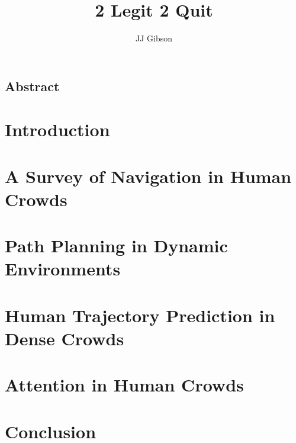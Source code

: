 \documentclass[twoside,10pt]{report}
\newcommand{\clearemptydoublepage}{\newpage{\pagestyle{empty}\cleardoublepage}}
\begin{document}


\title{2 Legit 2 Quit}
\author{JJ Gibson}



\clearpage


\clearemptydoublepage
\setcounter{page}{1}

\begin{centering} \section*{Abstract} \end{centering}


\tableofcontents
\clearpage


\setcounter{page}{1}


\chapter{Introduction}
\label{chap:introduction}


\clearpage

\chapter{A Survey of Navigation in Human Crowds}
\label{chap:survey}


\clearpage

\chapter{Path Planning in Dynamic Environments}
\label{chap:ppad}


\clearpage

\chapter{Human Trajectory Prediction in Dense Crowds}
\label{chap:oigp}


\clearpage

\chapter{Attention in Human Crowds}
\label{chap:attn}


\clearpage

\chapter{Conclusion}
\label{chap:conclusion}


 
{\small }
\end{document}
